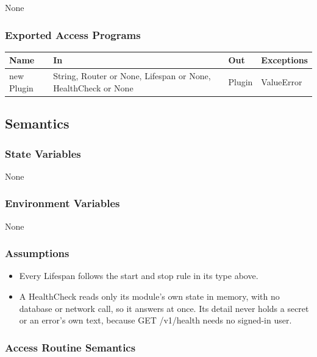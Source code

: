 \documentclass[12pt, titlepage]{article}
\begin{document}
None

\subsubsection{Exported Access Programs}

\begin{center}
\begin{tabular}{p{2.4cm} p{6.4cm} p{2cm} p{2.6cm}}
\toprule
\textbf{Name} & \textbf{In} & \textbf{Out} & \textbf{Exceptions} \\
\midrule
new Plugin & String, Router or None, Lifespan or None, HealthCheck or None &
  Plugin & ValueError \\
\bottomrule
\end{tabular}
\end{center}

\subsection{Semantics}

\subsubsection{State Variables}

None

\subsubsection{Environment Variables}

None

\subsubsection{Assumptions}

\begin{itemize}
\item Every Lifespan follows the start and stop rule in its type above.
\item A HealthCheck reads only its module's own state in memory, with no
  database or network call, so it answers at once. Its detail never holds a
  secret or an error's own text, because GET /v1/health needs no signed-in
  user.
\end{itemize}

\subsubsection{Access Routine Semantics}
\end{document}
